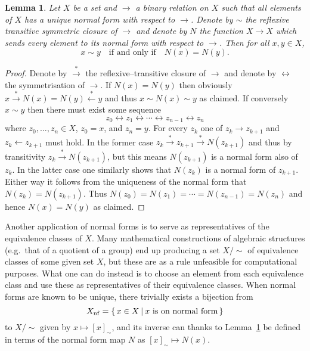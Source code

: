 \documentclass[12pt]{article}
\newtheorem{lem}{Lemma}
\theoremstyle{definition}
\newcommand*{\setOf}[2]{%
   \left\{ \, #1 \,\,\vrule\,\, #2 \, \right\}%
}
\begin{document}
\begin{lem} \label{L:EquivAndNF}
  Let $X$ be a set and $\rightarrow$ a binary relation on $X$ such 
  that all elements of $X$ has a unique normal form with respect to 
  $\rightarrow$. Denote by $\sim$ the reflexive transitive symmetric 
  closure of $\rightarrow$ and denote by $N$ the function 
  \(X \longrightarrow X\) which sends every element to its normal 
  form with respect to $\rightarrow$. Then for all \(x,y \in X\),
  \begin{equation}
     x \sim y \quad\text{if and only if}\quad N(x)=N(y) \text{.}
  \end{equation}
\end{lem}
\begin{proof}
  Denote by $\stackrel{*}{\rightarrow}$ the reflexive--transitive 
  closure of $\rightarrow$ and denote by $\leftrightarrow$ the 
  symmetrisation of $\rightarrow$. If \(N(x)=N(y)\) then obviously 
  \(x \stackrel{*}{\rightarrow} N(x) = N(y) \stackrel{*}{\leftarrow} 
  y\) and thus \(x \sim N(x) \sim y\) as claimed. If conversely \(x 
  \sim y\) then there must exist some sequence
  $$
    z_0 \leftrightarrow z_1 \leftrightarrow \dotsb \leftrightarrow 
    z_{n-1} \leftrightarrow z_n
  $$
  where \(z_0,\dotsc,z_n \in X\), \(z_0=x\), and \(z_n=y\). For every 
  $z_k$ one of \(z_k \rightarrow z_{k+1}\) and \(z_k \leftarrow 
  z_{k+1}\) must hold. In the former case \(z_k 
  \stackrel{*}{\rightarrow} z_{k+1} \stackrel{*}{\rightarrow} 
  N(z_{k+1})\) and thus by transitivity \(z_k \stackrel{*}{\rightarrow} 
  N(z_{k+1})\), but this means $N(z_{k+1})$ is a normal form also 
  of $z_k$. In the latter case one similarly shows that $N(z_k)$ is a 
  normal form of $z_{k+1}$. Either way it follows from the uniqueness 
  of the normal form that \(N(z_k) = N(z_{k+1})\). Thus \(N(z_0) = 
  N(z_1) = \dotsb = N(z_{n-1}) = N(z_n)\) and hence \(N(x)=N(y)\) as 
  claimed.
\end{proof}


Another application of normal forms is to serve as representatives of 
the equivalence classes of $X$. Many mathematical constructions of 
algebraic structures (e.g.~that of a quotient of a group) end up  
producing a set $X/{\sim}$ of equivalence classes of some given set 
$X$, but these are as a rule unfeasible for computational purposes. 
What one can do instead is to choose an element from each equivalence 
class and use these as representatives of their equivalence classes. 
When normal forms are known to be unique, there trivially exists a 
bijection from
$$
  X_{\mathrm{nf}} = \setOf{ x \in X }{ \text{$x$ is on normal form} }
$$
to $X/{\sim}$ given by \(x \mapsto [x]_\sim\), and its inverse can 
thanks to Lemma~\ref{L:EquivAndNF} be defined in terms of the normal 
form map $N$ as \([x]_\sim \mapsto N(x)\).
\end{document}
